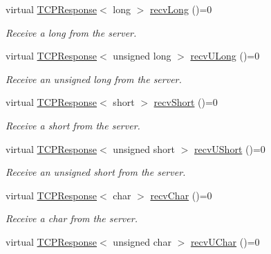 \begin{DoxyCompactItemize}
virtual \mbox{\hyperlink{class_rad_j_a_v_1_1_networking_1_1_t_c_p_response}{T\+C\+P\+Response}}$<$ long $>$ \mbox{\hyperlink{class_rad_j_a_v_1_1_networking_1_1_tcpip_client_a3c569e6a3da7e9925647af11a2f6e67e}{recv\+Long}} ()=0
\begin{DoxyCompactList}\small\item\em Receive a long from the server. \end{DoxyCompactList}\item 
virtual \mbox{\hyperlink{class_rad_j_a_v_1_1_networking_1_1_t_c_p_response}{T\+C\+P\+Response}}$<$ unsigned long $>$ \mbox{\hyperlink{class_rad_j_a_v_1_1_networking_1_1_tcpip_client_af87bb449baef6ea793babd5b11cd28e7}{recv\+U\+Long}} ()=0
\begin{DoxyCompactList}\small\item\em Receive an unsigned long from the server. \end{DoxyCompactList}\item 
virtual \mbox{\hyperlink{class_rad_j_a_v_1_1_networking_1_1_t_c_p_response}{T\+C\+P\+Response}}$<$ short $>$ \mbox{\hyperlink{class_rad_j_a_v_1_1_networking_1_1_tcpip_client_a8dad9172da96083b5317d28522f47cba}{recv\+Short}} ()=0
\begin{DoxyCompactList}\small\item\em Receive a short from the server. \end{DoxyCompactList}\item 
virtual \mbox{\hyperlink{class_rad_j_a_v_1_1_networking_1_1_t_c_p_response}{T\+C\+P\+Response}}$<$ unsigned short $>$ \mbox{\hyperlink{class_rad_j_a_v_1_1_networking_1_1_tcpip_client_a85dd74424b331ea12115a2f85a9d2d5b}{recv\+U\+Short}} ()=0
\begin{DoxyCompactList}\small\item\em Receive an unsigned short from the server. \end{DoxyCompactList}\item 
virtual \mbox{\hyperlink{class_rad_j_a_v_1_1_networking_1_1_t_c_p_response}{T\+C\+P\+Response}}$<$ char $>$ \mbox{\hyperlink{class_rad_j_a_v_1_1_networking_1_1_tcpip_client_a831adf67f900d6bb5f57a38b800843b6}{recv\+Char}} ()=0
\begin{DoxyCompactList}\small\item\em Receive a char from the server. \end{DoxyCompactList}\item 
virtual \mbox{\hyperlink{class_rad_j_a_v_1_1_networking_1_1_t_c_p_response}{T\+C\+P\+Response}}$<$ unsigned char $>$ \mbox{\hyperlink{class_rad_j_a_v_1_1_networking_1_1_tcpip_client_aae09d9ff1d6c436b3a624bc94afce148}{recv\+U\+Char}} ()=0

\end{DoxyCompactItemize}
